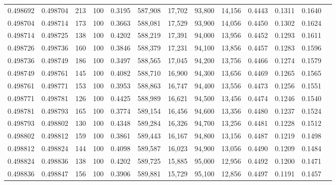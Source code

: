 \begin{tabular}{rrrrrrrrrrrrr}
0.498692 & 0.498704 &   213 & 100 &                                     0.3195 & 587,908 &  17,702 &  93,800 &  14,156 & 0.4443 & 0.1311 & 0.1640 \\
0.498704 & 0.498714 &   173 & 100 &                                     0.3663 & 588,081 &  17,529 &  93,900 &  14,056 & 0.4450 & 0.1302 & 0.1624 \\
0.498714 & 0.498725 &   138 & 100 &                                     0.4202 & 588,219 &  17,391 &  94,000 &  13,956 & 0.4452 & 0.1293 & 0.1611 \\
0.498726 & 0.498736 &   160 & 100 &                                     0.3846 & 588,379 &  17,231 &  94,100 &  13,856 & 0.4457 & 0.1283 & 0.1596 \\
0.498736 & 0.498749 &   186 & 100 &                                     0.3497 & 588,565 &  17,045 &  94,200 &  13,756 & 0.4466 & 0.1274 & 0.1579 \\
0.498749 & 0.498761 &   145 & 100 &                                     0.4082 & 588,710 &  16,900 &  94,300 &  13,656 & 0.4469 & 0.1265 & 0.1565 \\
0.498761 & 0.498771 &   153 & 100 &                                     0.3953 & 588,863 &  16,747 &  94,400 &  13,556 & 0.4473 & 0.1256 & 0.1551 \\
0.498771 & 0.498781 &   126 & 100 &                                     0.4425 & 588,989 &  16,621 &  94,500 &  13,456 & 0.4474 & 0.1246 & 0.1540 \\
0.498781 & 0.498793 &   165 & 100 &                                     0.3774 & 589,154 &  16,456 &  94,600 &  13,356 & 0.4480 & 0.1237 & 0.1524 \\
0.498793 & 0.498802 &   130 & 100 &                                     0.4348 & 589,284 &  16,326 &  94,700 &  13,256 & 0.4481 & 0.1228 & 0.1512 \\
0.498802 & 0.498812 &   159 & 100 &                                     0.3861 & 589,443 &  16,167 &  94,800 &  13,156 & 0.4487 & 0.1219 & 0.1498 \\
0.498812 & 0.498824 &   144 & 100 &                                     0.4098 & 589,587 &  16,023 &  94,900 &  13,056 & 0.4490 & 0.1209 & 0.1484 \\
0.498824 & 0.498836 &   138 & 100 &                                     0.4202 & 589,725 &  15,885 &  95,000 &  12,956 & 0.4492 & 0.1200 & 0.1471 \\
0.498836 & 0.498847 &   156 & 100 &                                     0.3906 & 589,881 &  15,729 &  95,100 &  12,856 & 0.4497 & 0.1191 & 0.1457 \\

\end{tabular}
